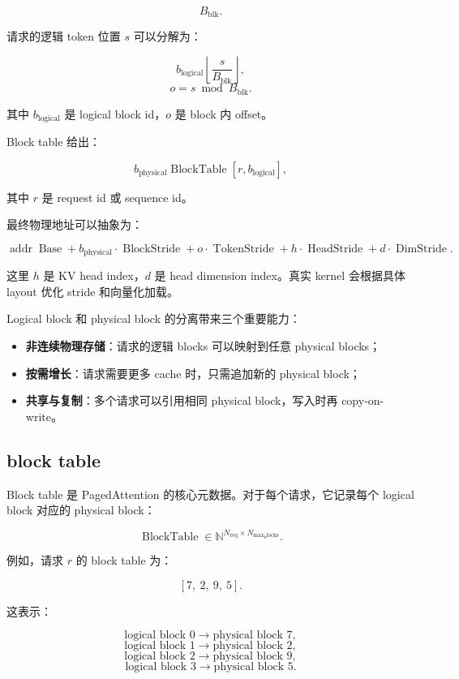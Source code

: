 \[
B_{\mathrm{blk}}.
\]

请求的逻辑 token 位置 $s$ 可以分解为：

\[
b_{\mathrm{logical}}
\left\lfloor
\frac{s}{B_{\mathrm{blk}}}
\right\rfloor,
\]
\[
o
=
s\bmod B_{\mathrm{blk}}.
\]

其中 $b_{\mathrm{logical}}$ 是 logical block id，$o$ 是 block 内 offset。

Block table 给出：

\[
b_{\mathrm{physical}}
\operatorname{BlockTable}[r,b_{\mathrm{logical}}],
\]

其中 $r$ 是 request id 或 sequence id。

最终物理地址可以抽象为：

\[
\operatorname{addr}
\operatorname{Base}
+
b_{\mathrm{physical}}
\cdot
\operatorname{BlockStride}
+
o
\cdot
\operatorname{TokenStride}
+
h
\cdot
\operatorname{HeadStride}
+
d
\cdot
\operatorname{DimStride}.
\]

这里 $h$ 是 KV head index，$d$ 是 head dimension index。真实 kernel 会根据具体 layout 优化 stride 和向量化加载。

Logical block 和 physical block 的分离带来三个重要能力：

\begin{itemize}
\item \textbf{非连续物理存储}：请求的逻辑 blocks 可以映射到任意 physical blocks；
\item \textbf{按需增长}：请求需要更多 cache 时，只需追加新的 physical block；
\item \textbf{共享与复制}：多个请求可以引用相同 physical block，写入时再 copy-on-write。
\end{itemize}

\subsection{block table}
\label{subsec:block-table}

Block table 是 PagedAttention 的核心元数据。对于每个请求，它记录每个 logical block 对应的 physical block：

\[
\operatorname{BlockTable}
\in
\mathbb{N}^{N_{\mathrm{req}}\times N_{\mathrm{max_blocks}}}.
\]

例如，请求 $r$ 的 block table 为：

\[
[7,\ 2,\ 9,\ 5].
\]

这表示：

\[
\text{logical block }0\rightarrow\text{physical block }7,
\]
\[
\text{logical block }1\rightarrow\text{physical block }2,
\]
\[
\text{logical block }2\rightarrow\text{physical block }9,
\]
\[
\text{logical block }3\rightarrow\text{physical block }5.
\]

